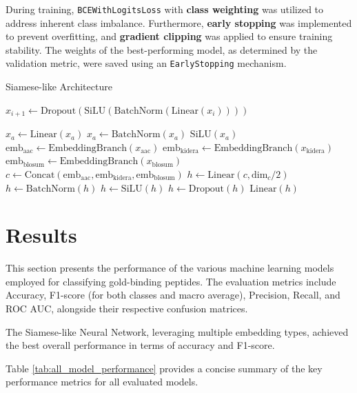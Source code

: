 \documentclass{article}
\begin{document}
During training, \texttt{BCEWithLogitsLoss} with \textbf{class weighting} was utilized to address inherent class imbalance. Furthermore, \textbf{early stopping} was implemented to prevent overfitting, and \textbf{gradient clipping} was applied to ensure training stability. The weights of the best-performing model, as determined by the validation metric, were saved using an \texttt{EarlyStopping} mechanism.

\begin{algorithm}
\caption{Siamese-like Architecture}
\begin{algorithmic}[1]
\Statex
{}
    \State $x_{i+1} \gets \text{Dropout}(\text{SiLU}(\text{BatchNorm}(\text{Linear}(x_{i}))))$
    
    \State $x_a \gets \text{Linear}(x_a)$
    \State $x_a \gets \text{BatchNorm}(x_a)$
    \State \Return $\text{SiLU}(x_a)$
\EndFunction
\Statex
{}
    \State $\text{emb}_{\text{aac}} \gets \text{EmbeddingBranch}(x_{\text{aac}})$
    \State $\text{emb}_{\text{kidera}} \gets \text{EmbeddingBranch}(x_{\text{kidera}})$
    \State $\text{emb}_{\text{blosum}} \gets \text{EmbeddingBranch}(x_{\text{blosum}})$
    \State $c \gets \text{Concat}(\text{emb}_{\text{aac}}, \text{emb}_{\text{kidera}}, \text{emb}_{\text{blosum}})$
    \State $h \gets \text{Linear}(c, \text{dim}_{c}/2)$
    \State $h \gets \text{BatchNorm}(h)$
    \State $h \gets \text{SiLU}(h)$
    \State $h \gets \text{Dropout}(h)$
    \State \Return $\text{Linear}(h)$
\EndFunction
\end{algorithmic}
\end{algorithm}

\section{Results}
This section presents the performance of the various machine learning models employed for classifying gold-binding peptides. The evaluation metrics include Accuracy, F1-score (for both classes and macro average), Precision, Recall, and ROC AUC, alongside their respective confusion matrices.

The Siamese-like Neural Network, leveraging multiple embedding types, achieved the best overall performance in terms of accuracy and F1-score.

Table \ref{tab:all_model_performance} provides a concise summary of the key performance metrics for all evaluated models.
\end{document}
